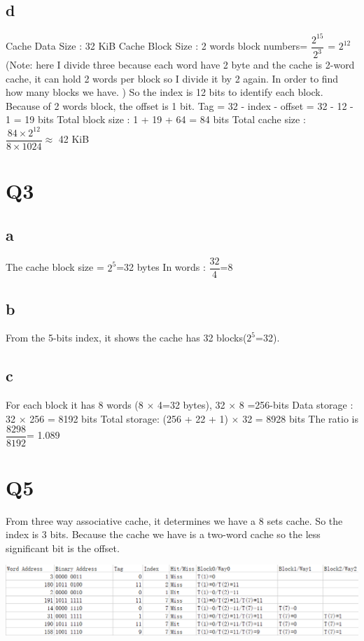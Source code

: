 \documentclass[]{article}
\begin{document}
\subsection*{d}
Cache Data Size : 32 KiB\newline
Cache Block Size : 2 words\newline
block numbers= $\dfrac{2^{15}}{2^3}$ = $2^{12}$\newline
(Note: here I divide three because each word have 2 byte and the cache is 2-word cache, it can hold 2 words per block so I divide it by 2 again. In order to find how many blocks we have. )\newline
So the index is 12 bits to identify each block.\newline
Because of 2 words block, the offset is 1 bit.\newline
Tag = 32 - index - offset = 32 - 12 - 1 = 19 bits\newline
Total block size : 1 + 19 + 64 = 84 bits\newline
Total cache size : $\dfrac{84 \times 2^{12}}{8\times 1024}\approx$ 42 KiB \newline

\section*{Q3}
\subsection*{a}
The cache block size = $2^{5}$=32 bytes \newline
In words : $\dfrac{32}{4}$=8\newline
\subsection*{b}
From the 5-bits index, it shows the cache has 32 blocks($2^5$=32).
\subsection*{c}
For each block it has 8 words (8 $\times$ 4=32 bytes), 32 $\times$ 8 =256-bits \newline
Data storage : 32 $\times$ 256 = 8192 bits\newline
Total storage: (256 + 22 + 1) $\times$ 32 = 8928 bits\newline
The ratio is $\dfrac{8298}{8192}$= 1.089\newline
\section*{Q5}
From three way associative cache, it determines we have a 8 sets cache. So the index is 3 bits. Because the cache we have is a two-word cache so the less significant bit is the offset. 
\begin{center}
	\includegraphics[width=150mm]{n242.png}
\end{center}
\end{document}
